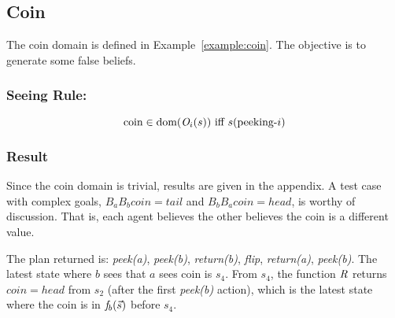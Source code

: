 

\subsection{Coin}
The coin domain is defined in Example~\ref{example:coin}.
The objective is to generate some false beliefs.


\subsubsection{Seeing Rule:}
\[
    \text{coin} \in \textrm{dom}(\mathit{O}_i(s)) \text{ iff } s(\text{peeking-$i$})
\]

\subsubsection{Result}
Since the coin domain is trivial, results are given in the appendix. 
A test case with complex goals, $B_a B_b coin=tail$ and $B_b B_a coin=head$, is worthy of discussion.
That is, each agent believes the other believes the coin is a different value.

The plan returned is:
\emph{peek(a)}, \emph{peek(b)}, \emph{return(b)}, \emph{flip}, \emph{return(a)}, \emph{peek(b)}.
The latest state where $b$ sees that $a$ sees coin is $s_4$.
From $s_4$, the function $\mathit{R}$ returns $coin=head$ from $s_2$ (after the first \emph{peek(b)} action), which is the latest state where the coin is in $\mathit{f}_b(\Vec{s})$ before $s_4$.


